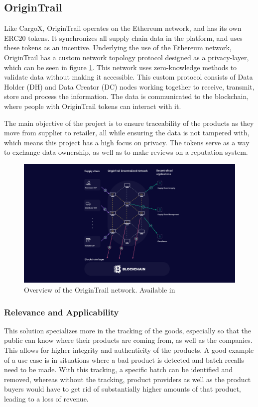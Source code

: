 \subsection{OriginTrail}
Like CargoX, OriginTrail operates on the Ethereum network, and has its own ERC20 tokens. It synchronizes all supply chain data in the platform, and uses these tokens as an incentive. Underlying the use of the Ethereum network, OriginTrail has a custom network topology protocol designed as a privacy-layer, which can be seen in figure \ref{fig:origintrail_network}. This network uses zero-knowledge methods to validate data without making it accessible. This custom protocol consists of Data Holder (DH) and Data Creator (DC) nodes working together to receive, transmit, store and process the information. The data is communicated to the blockchain, where people with OriginTrail tokens can interact with it.

The main objective of the project is to ensure traceability of the products as they move from supplier to retailer, all while ensuring the data is not tampered with, which means this project has a high focus on privacy. The tokens serve as a way to exchange data ownership, as well as to make reviews on a reputation system. \cite{Rakic2017}

\begin{figure}[h]
\centering
\includegraphics[scale=0.5]{media/origin_trail_network.jpg}
\caption[Overview of the OriginTrail network]{Overview of the OriginTrail network. Available in \cite{OriginTrailTechno}}
\label{fig:origintrail_network}
\end{figure}

\subsubsection{Relevance and Applicability}
This solution specializes more in the tracking of the goods, especially so that the public can know where their products are coming from, as well as the companies. This allows for higher integrity and authenticity of the products. A good example of a use case is in situations where a bad product is detected and batch recalls need to be made. With this tracking, a specific batch can be identified and removed, whereas without the tracking, product providers as well as the product buyers would have to get rid of substantially higher amounts of that product, leading to a loss of revenue.

